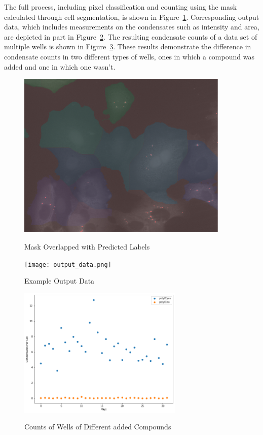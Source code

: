 \documentclass[12pt]{article}
\begin{document}
The full process, including pixel classification and counting using the mask calculated through
cell segmentation, is shown in Figure~\ref{fig:overlayed}. Corresponding output data, which 
includes measurements on the condensates such as intensity and area, are depicted in part in 
Figure~\ref{fig:output_data}. The resulting condensate counts of a data set of multiple wells is shown 
in Figure~\ref{fig:well_results}. These results demonstrate the difference in condensate counts in two
different types of wells, ones in which a compound was added and one in which one wasn't.

\begin{figure}[H]
    \centering
    {
        {
            {
                \includegraphics[width=0.9\textwidth]{overlayed.png}
            }
        }
    }\caption{Mask Overlapped with Predicted Labels}
    \label{fig:overlayed}
\end{figure}

\begin{figure}[H]
    \centering
    {
        {
            {
                \texttt{[image: output\_data.png]}
            }
        }
    }\caption{Example Output Data}
    \label{fig:output_data}
\end{figure}

\begin{figure}[H]
    \centering
    {
        {
            {
                \includegraphics[width=0.7\textwidth]{well_results.png}
            }
        }
    }\caption{Counts of Wells of Different added Compounds}
    \label{fig:well_results}
\end{figure}
\end{document}
